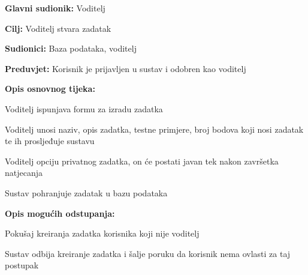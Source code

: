 					\noindent {}
					\begin{packed_item}
						
						\item \textbf{Glavni sudionik: }Voditelj
						\item  \textbf{Cilj:} Voditelj stvara zadatak 
						\item  \textbf{Sudionici:} Baza podataka, voditelj
						\item  \textbf{Preduvjet:} Korisnik je prijavljen u sustav i odobren kao voditelj
						\item  \textbf{Opis osnovnog tijeka:}
						
						\item[] \begin{packed_enum}
							
							\item Voditelj ispunjava formu za izradu zadatka
							\item Voditelj unosi naziv, opis zadatka, testne primjere, broj bodova koji nosi zadatak te ih prosljeđuje sustavu
							\item Voditelj opciju privatnog zadatka, on će postati javan tek nakon završetka natjecanja
							\item Sustav pohranjuje zadatak u bazu podataka
							
						\end{packed_enum}
						
						\item  \textbf{Opis mogućih odstupanja:}
						
						\item[] \begin{packed_item}
							
							\item[2.a] Pokušaj kreiranja zadatka korisnika koji nije voditelj
							\item[] \begin{packed_enum}
								
								\item Sustav odbija kreiranje zadatka i šalje poruku da korisnik nema ovlasti za taj postupak 
								
							\end{packed_enum}
						\end{packed_item}
					\end{packed_item}
					
					\eject
					
